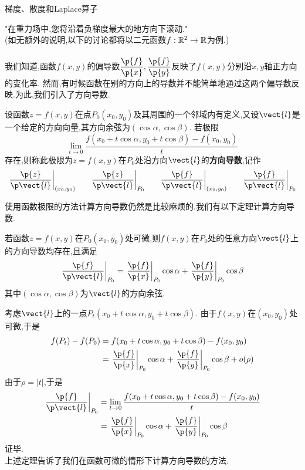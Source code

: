 \documentclass{ctexart}
\begin{document}
\pagestyle{empty}
\begin{center}\large 梯度、散度和Laplace算子\end{center}
"在重力场中,您将沿着负梯度最大的地方向下滚动."\\
(如无额外的说明,以下的讨论都将以二元函数$f:\mathbb{R}^2\to\mathbb{R}$为例.)\\
\\
我们知道,函数$f(x,y)$的偏导数$\dfrac{\p{f}}{\p{x}},\dfrac{\p{f}}{\p{y}}$反映了$f(x,y)$分别沿$x,y$轴正方向的变化率.
然而,有时候函数在别的方向上的导数并不能简单地通过这两个偏导数反映.为此,我们引入了方向导数.
\begin{formal}
    设函数$z=f(x,y)$在点$P_0(x_0,y_0)$及其周围的一个邻域内有定义,又设$\vect{l}$是一个给定的方向向量,其方向余弦为$(\cos\alpha,\cos\beta)$.
    若极限$$\lim_{t\to0}\dfrac{f(x_0+t\cos\alpha,y_0+t\cos\beta)-f(x_0,y_0)}{t}$$
    存在,则称此极限为$z=f(x,y)$在$P_0$处沿方向$\vect{l}$的\textbf{方向导数},记作
    $$\left.\dfrac{\p{z}}{\p\vect{l}}\right|_{(x_0,y_0)}\ \ \ \ \ \left.\dfrac{\p{z}}{\p\vect{l}}\right|_{P_0}\ \ \ \ \ \left.\dfrac{\p{f}}{\p\vect{l}}\right|_{(x_0,y_0)}\ \ \ \ \ \left.\dfrac{\p{f}}{\p\vect{l}}\right|_{P_0}$$
\end{formal}\noindent
使用函数极限的方法计算方向导数仍然是比较麻烦的.我们有以下定理计算方向导数.
\begin{theorem}
    若函数$z=f(x,y)$在$P_0(x_0,y_0)$处可微,则$f(x,y)$在$P_0$处的任意方向$\vect{l}$上的方向导数均存在,且满足
    $$\left.\dfrac{\p{f}}{\p\vect{l}}\right|_{P_0}=\left.\dfrac{\p{f}}{\p{x}}\right|_{P_0}\cos\alpha+\left.\dfrac{\p{f}}{\p{y}}\right|_{P_0}\cos\beta$$
    其中$(\cos\alpha,\cos\beta)$为$\vect{l}$的方向余弦.
\end{theorem}
\begin{solution}[Proof.]
    考虑$\vect{l}$上的一点$P_t(x_0+t\cos\alpha,y_0+t\cos\beta)$.
    由于$f(x,y)$在$(x_0,y_0)$处可微,于是
    $$\begin{aligned}
        f(P_t)-f(P_0)
        &= f(x_0+t\cos\alpha,y_0+t\cos\beta)-f(x_0,y_0) \\
        &= \left.\dfrac{\p{f}}{\p{x}}\right|_{P_0}\cos\alpha+\left.\dfrac{\p{f}}{\p{y}}\right|_{P_0}\cos\beta+o(\rho)
    \end{aligned}$$
    由于$\rho=\left|t\right|$,于是
    $$\begin{aligned}
        \left.\dfrac{\p{f}}{\p\vect{l}}\right|_{P_0}
        &= \lim_{t\to0}\dfrac{f(x_0+t\cos\alpha,y_0+t\cos\beta)-f(x_0,y_0)}{t} \\
        &= \left.\dfrac{\p{f}}{\p{x}}\right|_{P_0}\cos\alpha+\left.\dfrac{\p{f}}{\p{y}}\right|_{P_0}\cos\beta
    \end{aligned}$$
    证毕.\\
    上述定理告诉了我们在函数可微的情形下计算方向导数的方法.
\end{solution}\noindent
\end{document}
